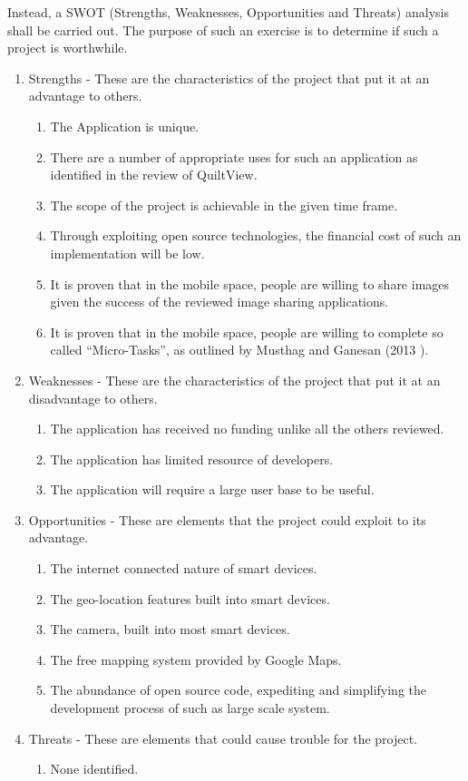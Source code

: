 \documentclass[a4paper]{article}
\begin{document}
Instead, a SWOT (Strengths, Weaknesses, Opportunities and Threats) analysis shall be carried out. The purpose of such an exercise is to determine if such a project is worthwhile.

\begin{enumerate}
\item{Strengths}
- These are the characteristics of the project that put it at an advantage to others.


\begin{enumerate}
\item The Application is unique.
\item There are a number of appropriate uses for such an application as identified in the review of QuiltView\cite{chen2014quiltview}.
\item The scope of the project is achievable in the given time frame.
\item Through exploiting open source technologies, the financial cost of such an implementation will be low.
\item It is proven that in the mobile space, people are willing to share images given the success of the reviewed image sharing applications.
\item It is proven that in the mobile space, people are willing to complete so called ``Micro-Tasks'', as outlined by Musthag and Ganesan (2013 )\cite{musthag2013labor}.
\end{enumerate}


\item{Weaknesses} 
- These are the characteristics of the project that put it at an disadvantage to others.
\begin{enumerate}
\item The application has received no funding unlike all the others reviewed.
\item The application has limited resource of developers.
\item The application will require a large user base to be useful.
\end{enumerate}

\item{Opportunities}
- These are elements that the project could exploit to its advantage.
\begin{enumerate}
\item The internet connected nature of smart devices.
\item The geo-location features built into smart devices.
\item The camera, built into most smart devices.
\item The free mapping system provided by Google Maps.
\item The abundance of open source code, expediting and simplifying the development process of such as large scale system.
\end{enumerate}


\item{Threats }
- These are elements that could cause trouble for the project.
\begin{enumerate}
\item None identified.
\end{enumerate}
\end{enumerate}
\end{document}
